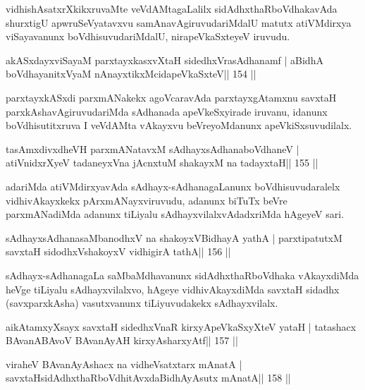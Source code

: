 \begin{artha}
vidhishAsatxrXkikxruvaMte veVdAMtagaLalilx sidAdhxthaRboVdhakavAda shurxtigU apwruSeVyatavxvu samAnavAgiruvudariMdalU matutx atiVMdirxya viSayavanunx boVdhisuvudariMdalU, nirapeVkaSxteyeV iruvudu.
\end{artha}

\begin{shl}
akASxdayxviSayaM parxtayxkasxvXtaH sidedhxVrasAdhanamf |
aBidhA boVdhayanitxVyaM nAnayxtikxMcidapeVkaSxteV\hfill || 154 ||
\end{shl}

\begin{artha}
parxtayxkASxdi parxmANakekx agoVcaravAda parxtayxgAtamxnu savxtaH parxkAshavAgiruvudariMda sAdhanada apeVkeSxyirade iruvanu, idanunx boVdhisutitxruva I veVdAMta vAkayxvu beVreyoMdanunx apeVkiSxsuvudilalx.
\end{artha}

\begin{shl}
tasAmxdivxdheVH parxmANatavxM sAdhayxsAdhanaboVdhaneV |
atiVnidxrXyeV tadaneyxVna jAcnxtuM shakayxM na tadayxtaH\hfill || 155 ||
\end{shl}

\begin{artha}
adariMda atiVMdirxyavAda sAdhayx-sAdhanagaLanunx boVdhisuvudaralelx vidhivAkayxkekx pArxmANayxviruvudu, adanunx biTuTx beVre parxmANadiMda adanunx tiLiyalu sAdhayxvilalxvAdadxriMda hAgeyeV sari.
\end{artha}

\begin{shl}
sAdhayxsAdhanasaMbanodhxV na shakoyxV\s BidhayA yathA |
parxtipatutxM savxtaH sidodhxV\s shakoyxV vidhigirA tathA\hfill || 156 ||
\end{shl}

\begin{artha}
sAdhayx-sAdhanagaLa saMbaMdhavanunx sidAdhxthaRboVdhaka vAkayxdiMda heVge tiLiyalu sAdhayxvilalxvo, hAgeye vidhivAkayxdiMda savxtaH sidadhx (savxparxkAsha) vasutxvanunx tiLiyuvudakekx sAdhayxvilalx.
\end{artha}


\begin{shl}
aikAtamxyXsayx savxtaH sidedhxVnaR kirxyA\s peVkaSxyXteV yataH |
tatashacx BAvanABAvoV BAvanAyAH kirxyAsharxyAtf\hfill || 157 ||
\end{shl}

\begin{shl}
viraheV BAvanAyAshacx na vidheVsatxtarx mAnatA |
savxtaHsidAdhxthaRboVdhitAvxdaBidhAyAsutx mAnatA\hfill || 158 ||
\end{shl}

